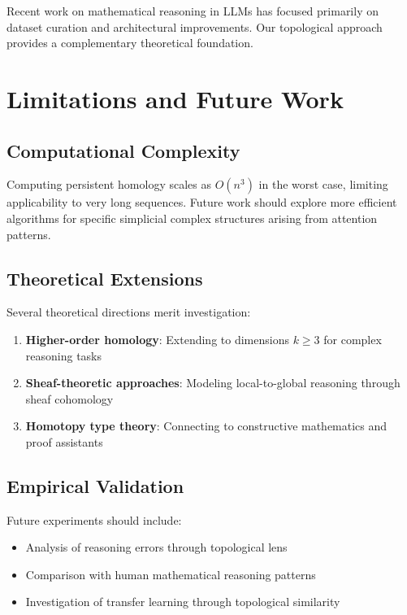 \documentclass[11pt,a4paper]{article}
\begin{document}
Recent work on mathematical reasoning in LLMs \cite{hendrycks2021,lewkowycz2022} has focused primarily on dataset curation and architectural improvements. Our topological approach provides a complementary theoretical foundation.

\section{Limitations and Future Work}

\subsection{Computational Complexity}

Computing persistent homology scales as $O(n^3)$ in the worst case, limiting applicability to very long sequences. Future work should explore more efficient algorithms for specific simplicial complex structures arising from attention patterns.

\subsection{Theoretical Extensions}

Several theoretical directions merit investigation:

\begin{enumerate}
\item \textbf{Higher-order homology}: Extending to dimensions $k \geq 3$ for complex reasoning tasks
\item \textbf{Sheaf-theoretic approaches}: Modeling local-to-global reasoning through sheaf cohomology
\item \textbf{Homotopy type theory}: Connecting to constructive mathematics and proof assistants
\end{enumerate}

\subsection{Empirical Validation}

Future experiments should include:
\begin{itemize}
\item Analysis of reasoning errors through topological lens
\item Comparison with human mathematical reasoning patterns
\item Investigation of transfer learning through topological similarity
\end{itemize}
\end{document}
